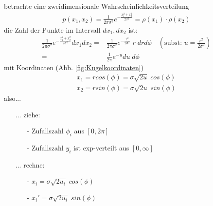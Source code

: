 \documentclass[12pt]{article}
\begin{document}
\begin{itemize}
betrachte eine zweidimensionale Wahrscheinlichkeitsverteilung
\begin{align}
p(x_1,x_2)=\frac{1}{	2 \pi \sigma^2} e^{- \frac{x_1^2 + x_2^2}{2 \sigma^2}} = \rho(x_1) \cdot \rho(x_2)
\end{align}
die Zahl der Punkte im Intervall $dx_1, dx_2$ ist:
\begin{align}
\frac{1}{	2 \pi \sigma^2} e^{- \frac{x_1^2 + x_2^2}{2 \sigma^2}} dx_1 dx_2= & \frac{1}{	2 \pi \sigma^2} e^{- \frac{r^2}{2 \sigma^2}} \;r \; dr  d\phi \quad \left( \mbox{subst: } u = \frac{r^2}{2 \sigma^2} \right) \\
= & \frac{1}{2 \pi} e^{-u} du \; d\phi
\end{align}
mit Koordinaten (Abb. \ref{fig:Kugelkoordinaten})
\begin{align*}
x_1=  r cos(\phi) = \sigma \sqrt{2 u} \; cos(\phi) \\
x_2=  r sin(\phi)= \sigma \sqrt{2 u} \; sin(\phi)
\end{align*}
also...
\begin{itemize}
\item[...] ziehe: 
\begin{itemize}
\item[-] Zufallszahl $\phi_i$ aus $[0,2\pi]$
\item[-] Zufallszahl $y_i$ ist exp-verteilt aus $[0, \infty]$
\end{itemize}
\item[...]rechne:
\begin{itemize}
\item[-] $x_i = \sigma \sqrt{2 u_i} \; cos(\phi)$
\item[-] $x_i' = \sigma \sqrt{2 u_i} \; sin(\phi)$
\end{itemize}
\end{itemize}




\end{itemize}
\end{document}
